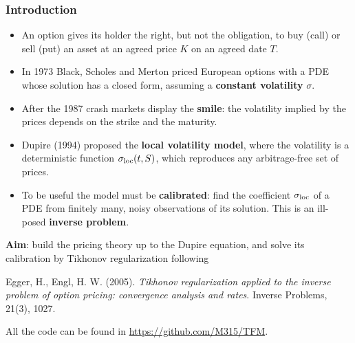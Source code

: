
\begin{frame}
\frametitle{Introduction}
\begin{scriptsize}
\begin{itemize}
\item An option gives its holder the right, but not the obligation,
to buy (call) or sell (put) an asset at an agreed price $K$ on an agreed date $T$.

\item In 1973 Black, Scholes and Merton priced European options with a PDE
whose solution has a closed form, assuming a \textbf{constant volatility} $\sigma$.

\item After the 1987 crash markets display the \textbf{smile}:
the volatility implied by the prices depends on the strike and the maturity.

\item Dupire (1994) proposed the \textbf{local volatility model},
where the volatility is a deterministic function $\sigma_{\mathrm{loc}}(t,S)$,
which reproduces any arbitrage-free set of prices.

\item To be useful the model must be \textbf{calibrated}:
find the coefficient $\sigma_{\mathrm{loc}}$ of a PDE from finitely many, noisy observations of its solution.
This is an ill-posed \textbf{inverse problem}.
\end{itemize}
\medskip

\textbf{Aim}: build the pricing theory up to the Dupire equation,
and solve its calibration by Tikhonov regularization following

\smallskip
Egger, H., Engl, H. W. (2005). \emph{Tikhonov regularization applied to the inverse problem of option pricing: convergence analysis and rates}. Inverse Problems, 21(3), 1027.

\smallskip
All the code can be found in \url{https://github.com/M315/TFM}.
\end{scriptsize}
\end{frame}

